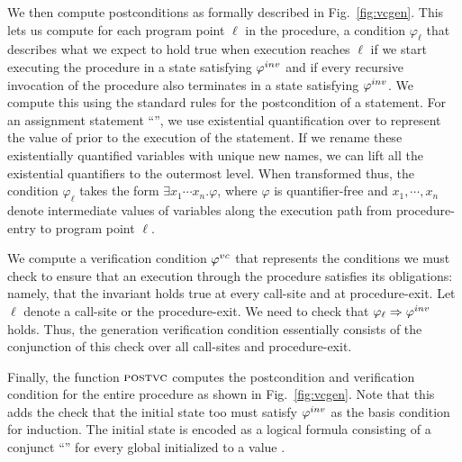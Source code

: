We then compute postconditions as formally described in Fig.~\ref{fig:vcgen}.
This lets us compute for each program point $\ell$ in the procedure,
a condition $\varphi_{\ell}$ that describes what we expect to hold true when execution reaches $\ell$ if we start
executing the procedure in a state satisfying $\varphi^{inv}$ and if every recursive invocation of the procedure also
terminates in a state satisfying $\varphi^{inv}$. We compute this using the standard rules for the postcondition of a statement.
%
For an assignment statement ``'', we use existential quantification over  to represent the value
of  prior to the execution of the statement. If we rename these existentially quantified variables with unique new
names, we can lift all the existential quantifiers to the outermost level. When transformed thus, the condition $\varphi_{\ell}$
takes the form $\exists x_1 \cdots x_n. \varphi$, where $\varphi$ is quantifier-free and $x_1, \cdots, x_n$ denote
intermediate values of variables along the execution path from procedure-entry to program point $\ell$.

We compute a verification condition $\varphi^{vc}$ that represents the conditions we must check to ensure that
an execution through the procedure satisfies its obligations: namely, that the invariant holds true at every call-site
and at procedure-exit. Let $\ell$ denote a call-site or the procedure-exit. We need to check that $\varphi_{\ell} \Rightarrow \varphi^{inv}$
holds. Thus, the generation verification condition essentially consists of the conjunction of this check over all call-sites
and procedure-exit.

Finally, the function $\textsc{postvc}$ computes the postcondition and verification condition for the entire procedure as shown
in Fig.~\ref{fig:vcgen}. Note that this adds the check that the initial state too must satisfy $\varphi^{inv}$ as the basis condition for
induction. The initial state is encoded as a logical formula consisting of a conjunct ``'' for every global 
initialized to a value .



